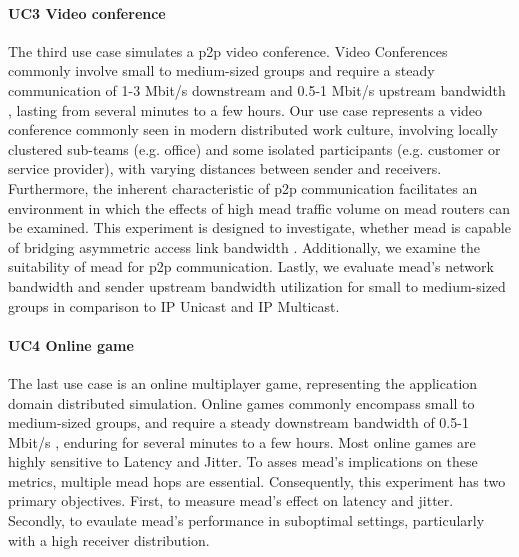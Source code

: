 \paragraph{UC3 Video conference} %
\label{par:EX3 Video conference}
The third use case simulates a \gls{p2p} video conference.
Video Conferences commonly involve small to medium-sized groups and require a
    steady communication of 1-3 Mbit/s downstream and 0.5-1 Mbit/s upstream
    bandwidth \cite{cartesian_us_bw}, lasting from several minutes to a few hours.
Our use case represents a video conference commonly  seen in modern distributed
    work culture, involving locally clustered sub-teams (e.g. office) and some
    isolated participants (e.g. customer or service provider), with varying
    distances between sender and receivers.
Furthermore, the inherent characteristic of \gls{p2p} communication facilitates
    an environment in which the effects of high \gls{mead} traffic volume on
    \gls{mead} routers can be examined.
This experiment is designed to investigate, whether \gls{mead} is capable of
    bridging asymmetric access link bandwidth \cite{xcast_rfc,cartesian_us_bw}.
Additionally, we examine the suitability of \gls{mead} for \gls{p2p}
    communication.
Lastly, we evaluate \gls{mead}'s network bandwidth and sender upstream
    bandwidth utilization for small to medium-sized groups in comparison to IP
    Unicast and IP Multicast.

\paragraph{UC4 Online game} %
\label{par:EX4 Online game}
The last use case is an online multiplayer game, representing the application
    domain distributed simulation.
Online games commonly encompass small to medium-sized groups, and require a
    steady downstream bandwidth of 0.5-1 Mbit/s \cite{cartesian_us_bw},
    enduring for several minutes to a few hours.
Most online games are highly sensitive to Latency and Jitter.
To asses \gls{mead}'s implications on these metrics, multiple \gls{mead}
    hops are essential.
Consequently, this experiment has two primary objectives.
First, to measure \gls{mead}'s effect on latency and jitter.
Secondly, to evaulate \gls{mead}'s performance in suboptimal settings,
    particularly with a high receiver distribution.


